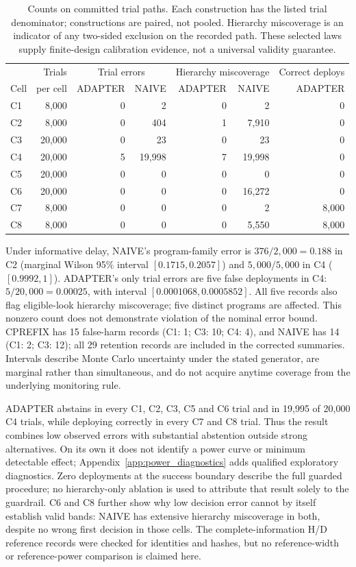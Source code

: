 \begin{table}[ht]
\centering\small
\begin{tabular}{lrrrrrr}
\toprule
& Trials & \multicolumn{2}{c}{Trial errors} & \multicolumn{2}{c}{Hierarchy miscoverage} & Correct deploys\\
Cell & per cell & ADAPTER & NAIVE & ADAPTER & NAIVE & ADAPTER\\
\midrule
C1 & 8,000 & 0 & 2 & 0 & 2 & 0\\
C2 & 8,000 & 0 & 404 & 1 & 7,910 & 0\\
C3 & 20,000 & 0 & 23 & 0 & 23 & 0\\
C4 & 20,000 & 5 & 19,998 & 7 & 19,998 & 0\\
C5 & 20,000 & 0 & 0 & 0 & 0 & 0\\
C6 & 20,000 & 0 & 0 & 0 & 16,272 & 0\\
C7 & 8,000 & 0 & 0 & 0 & 2 & 8,000\\
C8 & 8,000 & 0 & 0 & 0 & 5,550 & 8,000\\
\bottomrule
\end{tabular}
\caption{Counts on committed trial paths. Each construction has the listed trial
denominator; constructions are paired, not pooled. Hierarchy miscoverage is an
indicator of any two-sided exclusion on the recorded path. These selected laws
supply finite-design calibration evidence, not a universal validity guarantee.}
\label{tab:t1_validation}
\end{table}

Under informative delay, NAIVE's program-family error is $376/2{,}000=0.188$
in C2 (marginal Wilson 95\% interval $[0.1715,0.2057]$) and $5{,}000/5{,}000$
in C4 ($[0.9992,1]$). ADAPTER's only trial errors are five false deployments in
C4: $5/20{,}000=0.00025$, with interval $[0.0001068,0.0005852]$.
All five records also flag eligible-look hierarchy miscoverage; five distinct
programs are affected. This nonzero count does not demonstrate violation of the
nominal error bound. CPREFIX has 15 false-harm records (C1: 1; C3: 10; C4: 4),
and NAIVE has 14 (C1: 2; C3: 12); all 29 retention records are included in the
corrected summaries. Intervals describe Monte Carlo uncertainty under the stated
generator, are marginal rather than simultaneous, and do not acquire anytime
coverage from the underlying monitoring rule.

ADAPTER abstains in every C1, C2, C3, C5 and C6 trial and in 19,995 of 20,000
C4 trials, while deploying correctly in every C7 and C8 trial. Thus the result
combines low observed errors with substantial abstention outside strong
alternatives. On its own it does not identify a power curve or minimum detectable effect;
Appendix~\ref{app:power_diagnostics} adds qualified exploratory diagnostics.
Zero deployments at the success boundary describe the full guarded procedure;
no hierarchy-only ablation is used to attribute that result solely to the guardrail.
C6 and C8 further show why low decision error cannot by itself establish valid
bands: NAIVE has extensive hierarchy miscoverage in both, despite no wrong
first decision in those cells. The complete-information H/D reference records
were checked for identities and hashes, but no reference-width or reference-power
comparison is claimed here.

